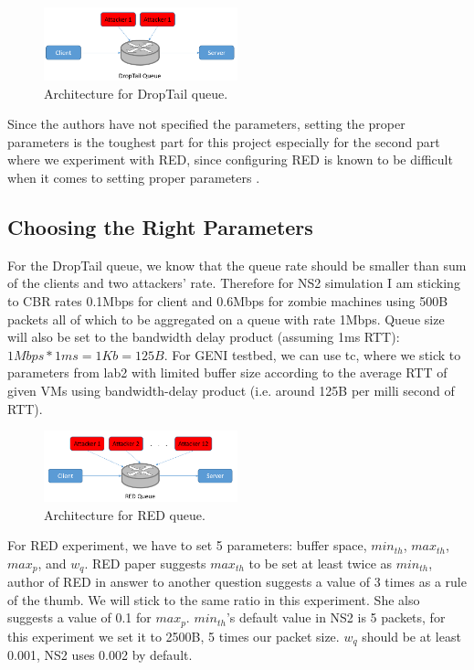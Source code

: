 \documentclass[12pt,twocolumn]{article}
\begin{document}
\begin{figure}[b]
    \centering
    \includegraphics[width=0.5\textwidth]{../Figures/arch1.png} \caption{Architecture for DropTail queue.} \label{arch1}
\end{figure}

Since the authors have not specified the parameters, setting the proper parameters is the toughest part for this project especially for the second part where we experiment with RED, since configuring RED is known to be difficult when it comes to setting proper parameters \cite{floyd1993random}.

\subsection{Choosing the Right Parameters}

For the DropTail queue, we know that the queue rate should be smaller than sum of the clients and two attackers’ rate.
Therefore for NS2 simulation I am sticking to CBR rates 0.1Mbps for client and 0.6Mbps for zombie machines using 500B packets all of which to be aggregated on a queue with rate 1Mbps.
Queue size will also be set to the bandwidth delay product (assuming 1ms RTT): $1Mbps*1ms=1Kb=125B$.
For GENI testbed, we can use tc, where we stick to parameters from lab2 with limited buffer size according to the average RTT of given VMs using bandwidth-delay product (i.e. around 125B per milli second of RTT).

\begin{figure}[b]
    \centering
    \includegraphics[width=0.5\textwidth]{../Figures/arch2.png} \caption{Architecture for RED queue.} \label{arch2}
\end{figure}

For RED experiment, we have to set 5 parameters: buffer space, $min_{th}$, $max_{th}$, $max_p$, and $w_q$.
RED paper suggests $max_{th}$ to be set at least twice as $min_{th}$, author of RED in answer to another question \cite{red} suggests a value of 3 times as a rule of the thumb.
We will stick to the same ratio in this experiment.
She also suggests a value of 0.1 for $max_p$.
$min_{th}$’s default value in NS2 is 5 packets, for this experiment we set it to 2500B, 5 times our packet size.
$w_q$ should be at least 0.001, NS2 uses 0.002 by default.
\end{document}
